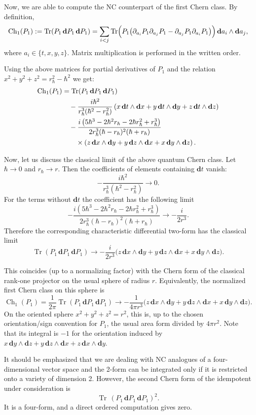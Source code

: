 \documentclass[11pt]{article}
\DeclareMathOperator{\Tr}{Tr}
\newcommand{\hh}{\hbar}
\newcommand{\rh}{r_{\hbar}}
\newcommand{\dd}{\mathbf{d}}
\numberwithin{equation}{section}
\theoremstyle{plain}
\theoremstyle{definition}
\begin{document}
Now, we are able to compute the NC counterpart of the first Chern class. By definition,
\[
\operatorname{Ch}_1(P_1) := \Tr(P_1\,\dd P_1\,\dd P_1)
=\sum_{i<j}\Tr\Bigl(P_1\big(\partial_{a_i}P_1\partial_{a_j}P_1-\partial_{a_j}P_1\partial_{a_i}P_1\big)\Bigr)\,\dd {a_i}\wedge \dd {a_j},
\]
where $a_i\in\{t,x,y,z\}$. Matrix multiplication is performed in the written order.

Using the above matrices for partial derivatives of $P_1$ and the relation $x^2+y^2+z^2=\rh^2-\hh^2$ we get:
\begin{align}
\operatorname{Ch}_1(P_1)
&= \Tr(P_1\,\dd P_1\,\dd P_1) \notag\\
&\quad-\frac{i\hh^2}{\rh^3(\hh^2-\rh^2)}
\left(x\,\dd t\wedge \dd x+y\,\dd t\wedge \dd y+z\,\dd t\wedge \dd z\right) \notag\\
&\quad-\frac{i\left(5\hh^3-2\hh^2\rh-2\hh\rh^2+\rh^3\right)}
{2\rh^3(\hh-\rh)^2(\hh+\rh)} \notag\\
&\qquad\times
\left(z\,\dd x\wedge \dd y+y\,\dd z\wedge \dd x+x\,\dd y\wedge \dd z\right).
\label{first-q-Ch}
\end{align}

Now, let us discuss the classical limit of the above quantum Chern class. Let $\hh\to 0$ and $\rh\to r$. Then the coefficients
of elements containing $\dd t$ vanish:
\[
-\frac{i\hh^2}{\rh^3(\hh^2-\rh^2)}\longrightarrow 0.
\]
For the terms without $\dd t$ the coefficient  has the following limit
\[
-\frac{i(5\hh^3-2\hh^2\rh-2\hh\rh^2+\rh^3)}
{2\rh^3(\hh-\rh)^2(\hh+\rh)}
\longrightarrow
-\frac{i}{2r^3}.
\]
Therefore the corresponding characteristic differential two-form has the classical limit
\[
\Tr(P_1\,\dd P_1\,\dd P_1)
\longrightarrow
-\frac{i}{2r^3}
\bigl(z\,\dd x\wedge \dd y+y\,\dd z\wedge \dd x+x\,\dd y\wedge \dd z\bigr).
\]

This coincides  (up to a normalizing factor) with the Chern form of  the classical rank-one projector on the usual sphere of radius
$r$. Equivalently, the normalized first Chern class on this sphere  is
\[
\operatorname{Ch}_1(P_1)
=\frac{1}{2\pi}\Tr(P_1\,\dd P_1\,\dd P_1)
\longrightarrow
-\frac{1}{4\pi r^3}
\bigl(z\,\dd x\wedge \dd y+y\,\dd z\wedge \dd x+x\,\dd y\wedge \dd z\bigr).
\]
On the oriented sphere $x^2+y^2+z^2=r^2$, this is, up to the chosen orientation/sign convention for
$P_1$, the usual area form divided by $4\pi r^2$. Note that its integral is $-1$ for the orientation induced by
$x\,\dd y\wedge \dd z+y\,\dd z\wedge \dd x+z\,\dd x\wedge \dd y$.

It should be emphasized that we are dealing with NC analogues of a four-dimensional vector space and the 2-form can be integrated
only if it is restricted onto a variety of dimension 2. However, the second Chern form of the idempotent under consideration is
\[
\Tr\,(P_1\,\dd P_1\,\dd P_1)^2.
\]
It is a four-form, and a direct ordered computation gives zero.
\end{document}
